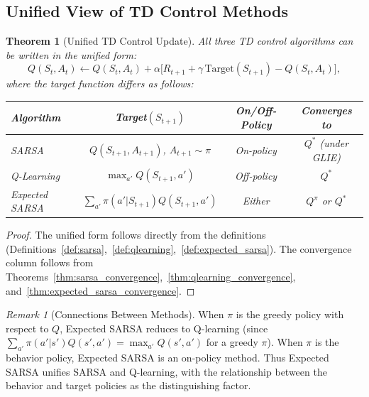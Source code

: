 \documentclass[11pt,a4paper]{article}
\theoremstyle{definition}
\theoremstyle{plain}
\newtheorem{theorem}{Theorem}[section]
\theoremstyle{remark}
\newtheorem{remark}{Remark}[section]
\begin{document}
\subsection{Unified View of TD Control Methods}
\label{subsec:unified_control}

\begin{theorem}[Unified TD Control Update]
\label{thm:unified_control}
All three TD control algorithms can be written in the unified form:
\begin{equation}
    Q(S_t, A_t) \leftarrow Q(S_t, A_t) + \alpha\bigl[R_{t+1} + \gamma\, \text{Target}(S_{t+1}) - Q(S_t, A_t)\bigr],
    \label{eq:unified_control}
\end{equation}
where the target function differs as follows:
\begin{center}
\begin{tabular}{lccc}
\toprule
\textbf{Algorithm} & \textbf{Target}$(S_{t+1})$ & \textbf{On/Off-Policy} & \textbf{Converges to} \\
\midrule
SARSA & $Q(S_{t+1}, A_{t+1})$, $A_{t+1} \sim \pi$ & On-policy & $Q^*$ (under GLIE) \\
Q-Learning & $\max_{a'} Q(S_{t+1}, a')$ & Off-policy & $Q^*$ \\
Expected SARSA & $\sum_{a'} \pi(a'|S_{t+1}) Q(S_{t+1}, a')$ & Either & $Q^\pi$ or $Q^*$ \\
\bottomrule
\end{tabular}
\end{center}
\end{theorem}

\begin{proof}
The unified form follows directly from the definitions (Definitions~\ref{def:sarsa},~\ref{def:qlearning},~\ref{def:expected_sarsa}). The convergence column follows from Theorems~\ref{thm:sarsa_convergence},~\ref{thm:qlearning_convergence}, and~\ref{thm:expected_sarsa_convergence}.
\end{proof}

\begin{remark}[Connections Between Methods]
\label{rem:control_connections}
When $\pi$ is the greedy policy with respect to $Q$, Expected SARSA reduces to Q-learning (since $\sum_{a'}\pi(a'|s')Q(s',a') = \max_{a'} Q(s',a')$ for a greedy $\pi$). When $\pi$ is the behavior policy, Expected SARSA is an on-policy method. Thus Expected SARSA unifies SARSA and Q-learning, with the relationship between the behavior and target policies as the distinguishing factor.
\end{remark}
\end{document}
